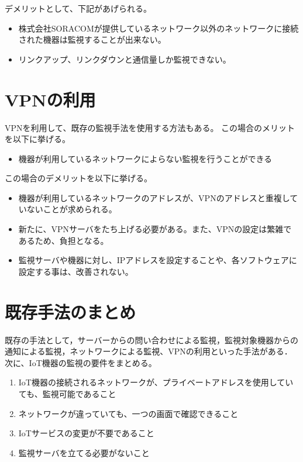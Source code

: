 	デメリットとして、下記があげられる。
	\begin{itemize}
		\item 株式会社SORACOMが提供しているネットワーク以外のネットワークに接続された機器は監視することが出来ない。
		\item リンクアップ、リンクダウンと通信量しか監視できない。
	\end{itemize}

\begin{comment}
	しかし，そのネットワークを利用している場合に限り機器の状況を推測できるので，異なるネットワークに接続された機器と，専用ネットワークを用いた機器とを１箇所で監視することが難しい．
\end{comment}

\section{VPNの利用}
	VPNを利用して、既存の監視手法を使用する方法もある。
	この場合のメリットを以下に挙げる。
	\begin{itemize}
		\item 機器が利用しているネットワークによらない監視を行うことができる
	\end{itemize}
	
	この場合のデメリットを以下に挙げる。
	\begin{itemize}
		\item 機器が利用しているネットワークのアドレスが、VPNのアドレスと重複していないことが求められる。
		\item 新たに、VPNサーバをたち上げる必要がある。また、VPNの設定は繁雑であるため、負担となる。
		\item 監視サーバや機器に対し、IPアドレスを設定することや、各ソフトウェアに設定する事は、改善されない。
	\end{itemize}

\begin{comment}
	しかし、この場合でも、VPNサーバを立ち上げなければならない、監視のためのサーバを立ち上げなければならない。
	またVPNクライアントが動く機器でないといけない。
	また、IoT機器が接続するネットワークのアドレスと、VPNのネットワークアドレスがかぶっていてはならない事が求められる。
	IoT機器が接続されるネットワークが様々であることを考えると、現実的ではない。
\end{comment}


\section{既存手法のまとめ}
	既存の手法として，サーバーからの問い合わせによる監視，監視対象機器からの通知による監視，ネットワークによる監視、VPNの利用といった手法がある．
	次に、IoT機器の監視の要件をまとめる。
	\begin{enumerate}
		\item IoT機器の接続されるネットワークが、プライベートアドレスを使用していても、監視可能であること
		\item ネットワークが違っていても、一つの画面で確認できること
		\item IoTサービスの変更が不要であること
		\item 監視サーバを立てる必要がないこと
	\end{enumerate}

